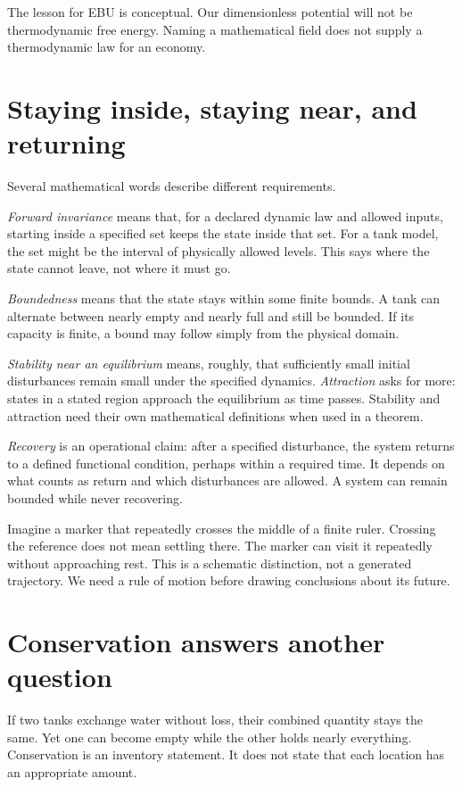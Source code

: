 The lesson for EBU is conceptual. Our dimensionless potential will not be thermodynamic free energy. Naming a mathematical field does not supply a thermodynamic law for an economy.

\section{Staying inside, staying near, and returning}
Several mathematical words describe different requirements.

\textit{Forward invariance} means that, for a declared dynamic law and allowed inputs, starting inside a specified set keeps the state inside that set. For a tank model, the set might be the interval of physically allowed levels. This says where the state cannot leave, not where it must go.

\textit{Boundedness} means that the state stays within some finite bounds. A tank can alternate between nearly empty and nearly full and still be bounded. If its capacity is finite, a bound may follow simply from the physical domain.

\textit{Stability near an equilibrium} means, roughly, that sufficiently small initial disturbances remain small under the specified dynamics. \textit{Attraction} asks for more: states in a stated region approach the equilibrium as time passes. Stability and attraction need their own mathematical definitions when used in a theorem.

\textit{Recovery} is an operational claim: after a specified disturbance, the system returns to a defined functional condition, perhaps within a required time. It depends on what counts as return and which disturbances are allowed. A system can remain bounded while never recovering.

Imagine a marker that repeatedly crosses the middle of a finite ruler. Crossing the reference does not mean settling there. The marker can visit it repeatedly without approaching rest. This is a schematic distinction, not a generated trajectory. We need a rule of motion before drawing conclusions about its future.

\section{Conservation answers another question}
If two tanks exchange water without loss, their combined quantity stays the same. Yet one can become empty while the other holds nearly everything. Conservation is an inventory statement. It does not state that each location has an appropriate amount.

